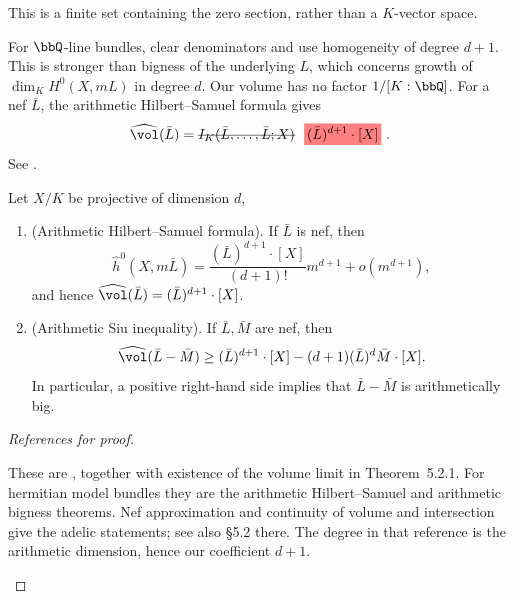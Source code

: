 \Yang{}

This is a finite set containing the zero section, rather than a $K$-vector space.

For $\bbQ$-line bundles, clear denominators and use homogeneity of degree $d+1$.
This is stronger than bigness of the underlying $L$, which concerns growth of $\dim_K H^0(X,mL)$ in degree $d$.
Our volume has no factor $1/[K:\bbQ]$.
For a nef $\bar L$, the arithmetic Hilbert--Samuel formula gives
\[ \widehat{\vol}(\bar L) = \latexdeletedmath{I_K(\bar L,\ldots,\bar L;X)}\latexaddedmath{(\bar L)^{d+1}\cdot[X]}. \]
See \cite[\S\S 5.1--5.2, especially Theorem~5.2.2]{Yuan-Zhang-2026-AdelicLineBundles}.

\Yang{}

\begin{theorem}[label=\labelNFM{thm:arithmetic-hilbert-samuel-siu-inequality}, status=draft, tag=0000000]
	Let $X/K$ be projective of dimension $d$, 
	\begin{enumerate}
		\item (Arithmetic Hilbert--Samuel formula). If $\bar L$ is nef, then
		      \[ \widehat h^0(X,m\bar L) = \frac{(\bar L)^{d+1}\cdot[X]}{(d+1)!}m^{d+1}+o(m^{d+1}), \]
		      and hence $\widehat{\vol}(\bar L) = (\bar L)^{d+1}\cdot[X]$.
		\item (Arithmetic Siu inequality). If $\bar L,\bar M$ are nef, then
		      \[ \widehat{\vol}(\bar L-\bar M) \geq (\bar L)^{d+1}\cdot[X]-(d+1)(\bar L)^d\bar M\cdot[X]. \]
		      In particular, a positive right-hand side implies that $\bar L-\bar M$ is arithmetically big.
	\end{enumerate}
	\Yang{}
\end{theorem}
\begin{proof}[References for proof]
	\leavevmode\par
	\Yang{}
	\begin{latexmathchange}
		These are \cite[Theorem~5.2.2(1)--(2)]{Yuan-Zhang-2026-AdelicLineBundles}, together with existence of the volume limit in Theorem~5.2.1.
		For hermitian model bundles they are the arithmetic Hilbert--Samuel and arithmetic bigness theorems.
		Nef approximation and continuity of volume and intersection give the adelic statements; see also \S 5.2 there.
		The degree in that reference is the arithmetic dimension, hence our coefficient $d+1$.
	\end{latexmathchange}
\end{proof}


































